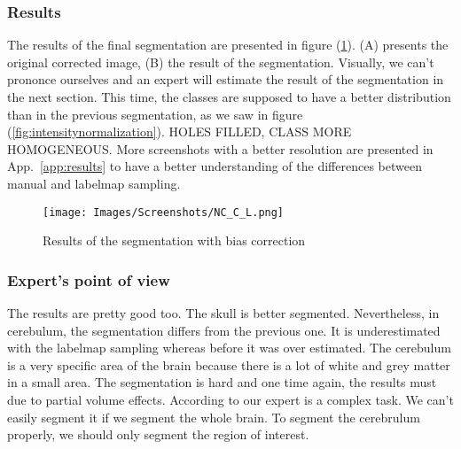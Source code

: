 \subsubsection{Results}

The results of the final segmentation are presented in figure (\ref{fig:NC_C_L}). (A) presents the original corrected image, (B) the result of the segmentation. Visually, we can't prononce ourselves and an expert will estimate the result of the segmentation in the next section. This time, the classes are supposed to have a better distribution than in the previous segmentation, as we saw in figure (\ref{fig:intensitynormalization}). HOLES FILLED, CLASS MORE HOMOGENEOUS. More screenshots with a better resolution are presented in App.~\ref{app:results} to have a better understanding of the differences between manual and labelmap sampling.

  \begin{figure}\centering
  \texttt{[image: Images/Screenshots/NC\_C\_L.png]}
  \caption{Results of the segmentation with bias correction}\label{fig:NC_C_L}
  \end{figure}
 
%
\subsubsection{Expert's point of view}
The results are pretty good too. The skull is better segmented. Nevertheless, in cerebulum, the segmentation differs from the previous one. It is underestimated  with the labelmap sampling whereas before it was over estimated. The cerebulum is a very specific area of the brain because there is a lot of white and grey matter in a small area. The segmentation is hard and one time again, the results must due to partial volume effects. According to our expert is a complex task. We can't easily segment it if we segment the whole brain. To segment the cerebrulum properly, we should only segment the region of interest.
%

%
%

%

